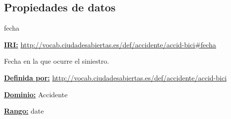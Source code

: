\subsection{Propiedades de datos}



\begin{mybox}{fecha}
\begin{flushleft}
\underline{\textbf{IRI:}}
\url{http://vocab.ciudadesabiertas.es/def/accidente/accid-bici#fecha}
\newline

Fecha en la que ocurre el siniestro.
\newline

\underline{\textbf{Definida por:}}
\url{http://vocab.ciudadesabiertas.es/def/accidente/accid-bici}
\newline

\underline{\textbf{Dominio:}}
\newline Accidente
\newline

\underline{\textbf{Rango:}} 
\newline date

\end{flushleft}
\end{mybox}



